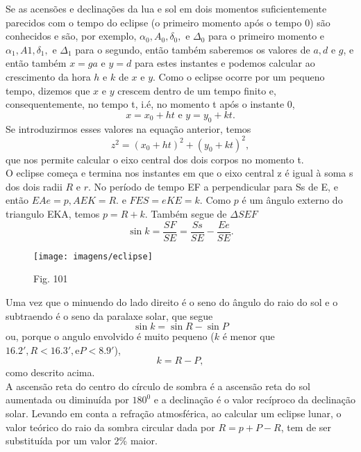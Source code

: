 Se as acensões e declinações da lua e sol em dois momentos suficientemente parecidos com o tempo do eclipse (o primeiro momento após o tempo 0) são conhecidos e são, por exemplo, $\alpha_0, A_0, \delta_0, \textrm{ e } \Delta_0$ para o primeiro momento e $\alpha_1, A1, \delta_1, \textrm{ e } \Delta_1$ para o segundo, então também saberemos os valores de $a, d \textrm{ e } g $, e então também $x=ga$ e $y=d$ para estes instantes e podemos calcular ao crescimento da hora $h$ e $k$ de $x$ e $y$. Como o eclipse ocorre por um pequeno tempo, dizemos que $x$ e $y$ crescem dentro de um tempo finito e, consequentemente, no tempo t, i.é, no momento t após o instante 0,
$$x=x_0+ht \textrm{ e } y=y_0+kt.$$
Se introduzirmos esses valores na equação anterior, temos 
$$z^2=(x_0+ht)^2+(y_0+kt)^2,$$
que nos permite calcular o eixo central dos dois corpos no momento t.\\
O eclipse começa e termina nos instantes em que o eixo central z é igual à soma s dos dois radii $R$ e $r$. No período de tempo EF a perpendicular para Ss de E, e então $EAe=p, AEK =R. \textrm{ e } FES=eKE=k.$ Como $p$ é um ângulo externo do triangulo EKA, temos $p=R+k$. Também segue de $\Delta SEF $
$$\sin k = \frac{SF}{SE} = \frac{Ss}{SE} - \frac{Ee}{SE}.$$    
\begin{figure}[h!]
	\centering
	\texttt{[image: imagens/eclipse]}
	\caption{Fig. 101}
	\label{figRotulo}
\end{figure}
Uma vez que o minuendo do lado direito é o seno do ângulo do raio do sol e o subtraendo é o seno da paralaxe solar, que segue 
$$\sin k = \sin R - \sin P$$
ou, porque o angulo envolvido é muito pequeno ($k$ é menor que $16.2', R< 16.3', \textrm{e}P<8.9'$),
$$k=R-P,$$
como descrito acima.\\
A ascensão reta do centro do círculo de sombra é a ascensão reta do sol aumentada ou diminuída por $180^0$ e a declinação é o valor recíproco da declinação solar. Levando em conta a refração atmosférica, ao calcular um eclipse lunar, o valor teórico do raio da sombra circular dada por $R=p+P-R$, tem de ser substituída por um valor 2\% maior.  
